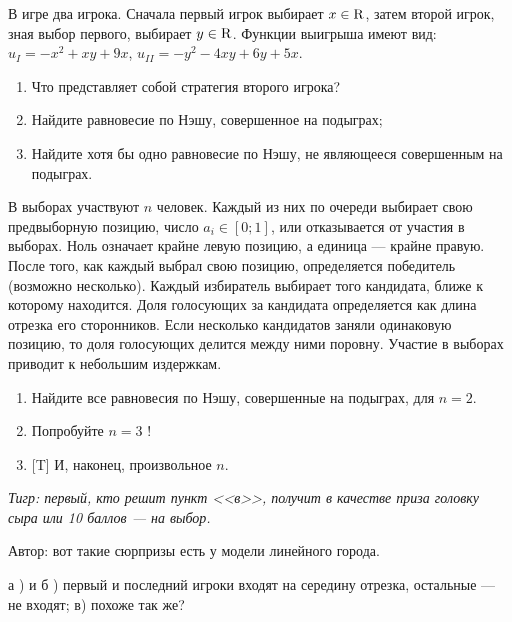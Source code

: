 \begin{problem}

В игре два игрока. Сначала первый игрок выбирает  $x\in {\rm R} $, затем второй игрок, зная выбор первого, выбирает  $y\in {\rm R} $.
Функции выигрыша имеют вид:  $u_{I} =-x^{2} +xy+9x$,  $u_{II} =-y^{2} -4xy+6y+5x$.\par
\begin{enumerate}
\item  Что представляет собой стратегия второго игрока?\par
\item Найдите равновесие по Нэшу, совершенное на подыграх;\par
\item  Найдите хотя бы одно равновесие по Нэшу, не являющееся совершенным на подыграх.\par
\end{enumerate}


\begin{sol}

\end{sol}
\end{problem}



\begin{problem}
В выборах участвуют  $n$  человек. Каждый из них по очереди выбирает свою предвыборную позицию, число  $a_{i} \in \left[0;1\right]$, или отказывается от участия в выборах. Ноль означает крайне левую позицию, а единица --- крайне правую. После того, как каждый выбрал свою позицию, определяется победитель (возможно несколько). Каждый избиратель выбирает того кандидата, ближе к которому находится. Доля голосующих за кандидата определяется как длина отрезка его сторонников. Если несколько кандидатов заняли одинаковую позицию, то доля голосующих делится между ними поровну. Участие в выборах приводит к небольшим издержкам.\par
\begin{enumerate}
\item  Найдите все равновесия по Нэшу, совершенные на подыграх, для  $n=2$.\par
\item Попробуйте  $n=3$ !\par
\item  $[$T] И, наконец, произвольное  $n$.\par
\end{enumerate}
{\it Тигр: первый, кто решит пункт <<в>>, получит в качестве приза головку сыра или 10 баллов --- на выбор.}\par
Автор: вот такие сюрпризы есть у модели линейного города.\par



\begin{sol}
а )  и б ) первый и последний игроки входят на середину отрезка, остальные --- не входят;
в)  похоже так же?
\end{sol}
\end{problem}



